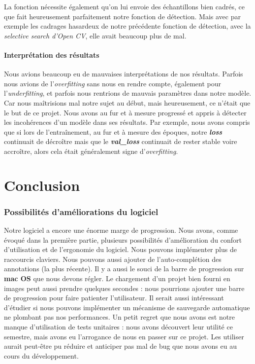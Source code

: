 \documentclass{rapport}
\begin{document}
        La fonction nécessite également qu'on lui envoie des échantillons bien cadrés, ce que fait heureusement parfaitement notre fonction de détection. Mais avec par exemple les cadrages hasardeux de notre précédente fonction de détection, avec la \textit{selective search d'Open CV}, elle avait beaucoup plus de mal.
        
        \subsection{Interprétation des résultats}
        Nous avions beaucoup eu de mauvaises interprétations de nos résultats. Parfois nous avions de l'\textit{overfitting} sans nous en rendre compte, également pour l'\textit{underfitting}, et parfois nous rentrions de mauvais paramètres dans notre modèle. Car nous maîtrisions mal notre sujet au début, mais heureusement, ce n'était que le but de ce projet. Nous avons au fur et à mesure progressé et appris à détecter les incohérences d'un modèle dans ses résultats. Par exemple, nous avons compris que si lors de l'entraînement, au fur et à mesure des époques, notre \textit{\textbf{loss}} continuait de décroître mais que le \textit{\textbf{val\_loss}} continuait de rester stable voire accroître, alors cela était généralement signe d'\textit{overfitting}.
        
        
    \clearpage
\part{Conclusion}
    
    \section{Possibilités d'améliorations du logiciel}
    Notre logiciel a encore une énorme marge de progression. Nous avons, comme évoqué dans la première partie, plusieurs possibilités d'amélioration du confort d'utilisation et de l'ergonomie du logiciel. Nous pouvons implémenter plus de raccourcis claviers. Nous pouvons aussi ajouter de l'auto-complétion des annotations (la plus récente). Il y a aussi le souci de la barre de progression sur \textbf{mac OS} que nous devons régler. Le chargement d'un projet bien fourni en images peut aussi prendre quelques secondes : nous pourrions ajouter une barre de progression pour faire patienter l'utilisateur. Il serait aussi intéressant d'étudier si nous pouvons implémenter un mécanisme de sauvegarde automatique ne plombant pas nos performances.
    Un petit regret que nous avons est notre manque d'utilisation de tests unitaires : nous avons découvert leur utilité ce semestre, mais avons eu l'arrogance de nous en passer sur ce projet. Les utiliser aurait peut-être pu réduire et anticiper pas mal de bug que nous avons eu au cours du développement.
    
\end{document}
